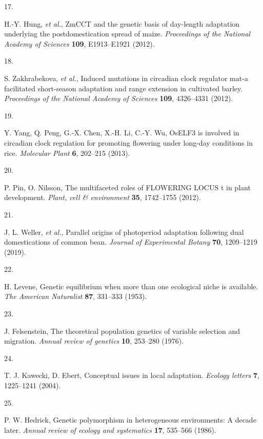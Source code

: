 \documentclass[
  9pt,
  twocolumn,
  twoside]{pnas-new}
\newlength{\cslhangindent}
\newlength{\csllabelwidth}
\newenvironment{CSLReferences}[2] %
 {\begin{list}{}{%
  \setlength{\itemindent}{0pt}
  \setlength{\leftmargin}{0pt}
  \setlength{\parsep}{0pt}
  \ifodd #1
   \setlength{\leftmargin}{\cslhangindent}
   \setlength{\itemindent}{-1\cslhangindent}
  \fi
  \setlength{\itemsep}{#2\baselineskip}}}
 {\end{list}}
\newcommand{\CSLLeftMargin}[1]{\parbox[t]{\csllabelwidth}{\strut#1\strut}}
\newcommand{\CSLRightInline}[1]{\parbox[t]{\linewidth - \csllabelwidth}{\strut#1\strut}}
\begin{document}
\begin{CSLReferences}{0}{1}
\CSLLeftMargin{17. }%
\CSLRightInline{H.-Y. Hung, \emph{et al.}, ZmCCT and the genetic basis
of day-length adaptation underlying the postdomestication spread of
maize. \emph{Proceedings of the National Academy of Sciences}
\textbf{109}, E1913--E1921 (2012).}

\CSLLeftMargin{18. }%
\CSLRightInline{S. Zakhrabekova, \emph{et al.}, Induced mutations in
circadian clock regulator mat-a facilitated short-season adaptation and
range extension in cultivated barley. \emph{Proceedings of the National
Academy of Sciences} \textbf{109}, 4326--4331 (2012).}

\CSLLeftMargin{19. }%
\CSLRightInline{Y. Yang, Q. Peng, G.-X. Chen, X.-H. Li, C.-Y. Wu, OsELF3
is involved in circadian clock regulation for promoting flowering under
long-day conditions in rice. \emph{Molecular Plant} \textbf{6}, 202--215
(2013).}

\CSLLeftMargin{20. }%
\CSLRightInline{P. Pin, O. Nilsson, The multifaceted roles of FLOWERING
LOCUS t in plant development. \emph{Plant, cell \& environment}
\textbf{35}, 1742--1755 (2012).}

\CSLLeftMargin{21. }%
\CSLRightInline{J. L. Weller, \emph{et al.}, Parallel origins of
photoperiod adaptation following dual domestications of common bean.
\emph{Journal of Experimental Botany} \textbf{70}, 1209--1219 (2019).}

\CSLLeftMargin{22. }%
\CSLRightInline{H. Levene, Genetic equilibrium when more than one
ecological niche is available. \emph{The American Naturalist}
\textbf{87}, 331--333 (1953).}

\CSLLeftMargin{23. }%
\CSLRightInline{J. Felsenstein, The theoretical population genetics of
variable selection and migration. \emph{Annual review of genetics}
\textbf{10}, 253--280 (1976).}

\CSLLeftMargin{24. }%
\CSLRightInline{T. J. Kawecki, D. Ebert, Conceptual issues in local
adaptation. \emph{Ecology letters} \textbf{7}, 1225--1241 (2004).}

\CSLLeftMargin{25. }%
\CSLRightInline{P. W. Hedrick, Genetic polymorphism in heterogeneous
environments: A decade later. \emph{Annual review of ecology and
systematics} \textbf{17}, 535--566 (1986).}


\end{CSLReferences}
\end{document}
